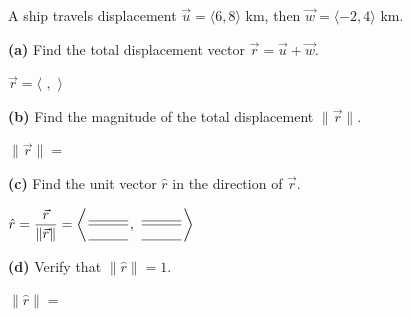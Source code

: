 \documentclass[10pt]{article}
\begin{document}
\vspace{0.1in}

\begin{tcolorbox}[colback=white, colframe=black!40,
    title=\textbf{Tier A --- Approaching Proficiency},
    fonttitle=\bfseries, arc=2mm, left=3mm, right=3mm, top=2mm, bottom=2mm]
\small
A ship travels displacement $\vec{u} = \langle 6, 8\rangle$ km, then
$\vec{w} = \langle -2, 4\rangle$ km.

\textbf{(a)} Find the total displacement vector $\vec{r} = \vec{u} + \vec{w}$.

\vspace{0.06in}
\hspace{1em} $\vec{r} = \langle$ \blank{2cm}$,$ \blank{2cm}$\rangle$

\vspace{0.14in}
\textbf{(b)} Find the magnitude of the total displacement $\|\vec{r}\|$.

\vspace{0.06in}
\hspace{1em} $\|\vec{r}\| = $ \blank{6cm}

\vspace{0.14in}
\textbf{(c)} Find the unit vector $\hat{r}$ in the direction of $\vec{r}$.

\vspace{0.06in}
\hspace{1em} $\hat{r} = \dfrac{\vec{r}}{\|\vec{r}\|} = \left\langle \dfrac{\blank{1cm}}{\blank{1cm}},\; \dfrac{\blank{1cm}}{\blank{1cm}} \right\rangle$

\vspace{0.14in}
\textbf{(d)} Verify that $\|\hat{r}\| = 1$.

\vspace{0.06in}
\hspace{1em} $\|\hat{r}\| = $ \blank{6cm}
\end{tcolorbox}

\vspace{0.1in}
\end{document}
